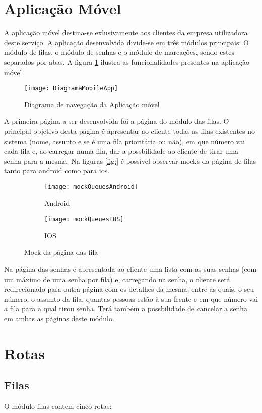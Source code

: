 \usepackage{graphicx}
\graphicspath{ {./images/} }

\section{Aplicação Móvel}
A aplicação móvel destina-se exlusivamente aos clientes da empresa utilizadora deste serviço. 
A aplicação desenvolvida divide-se em três módulos principais: O módulo de filas, o módulo de senhas
e o módulo de marcações, sendo estes separados por abas. A figura \ref{fig:diam} ilustra as funcionalidades presentes na aplicação móvel.
\begin{figure}[h]
    \centering
    \texttt{[image: DiagramaMobileApp]}
    \caption{Diagrama de navegação da Aplicação móvel}
    \label{fig:diam}
\end{figure}

A primeira página a ser desenvolvida foi a página do módulo das filas. O principal objetivo desta página é apresentar ao cliente
todas as filas existentes no sistema (nome, assunto e se é uma fila prioritária ou não), em que número vai cada fila e,
ao carregar numa fila, dar a possbilidade ao cliente de tirar uma senha para a mesma. Na figuras \ref{fig:} é possível observar mocks
da página de filas tanto para android como para ios.

\begin{figure}
\centering
\begin{subfigure}{.5\textwidth}
  \centering
  \texttt{[image: mockQueuesAndroid]}
  \caption{Android}
  \label{fig:queuesAndroid}
\end{subfigure}%
\begin{subfigure}{.5\textwidth}
  \centering
  \texttt{[image: mockQueuesIOS]}
  \caption{IOS}
  \label{fig:queuesIos}
\end{subfigure}
\caption{Mock da página das fila}
\label{fig:mockQueues}
\end{figure}
Na página das senhas é apresentada ao cliente uma lista com as suas senhas (com um máximo de uma senha por fila) e, carregando na senha,
o cliente será redirecionado para outra página com os detalhes da mesma, entre as quais, o seu número, o assunto da fila, quantas pessoas
estão à sua frente e em que número vai a fila para a qual tirou senha. Terá também a possbilidade de cancelar a senha em ambas as páginas
deste módulo.

\section{Rotas}
\subsection{Filas}
O módulo filas contem cinco rotas: 


